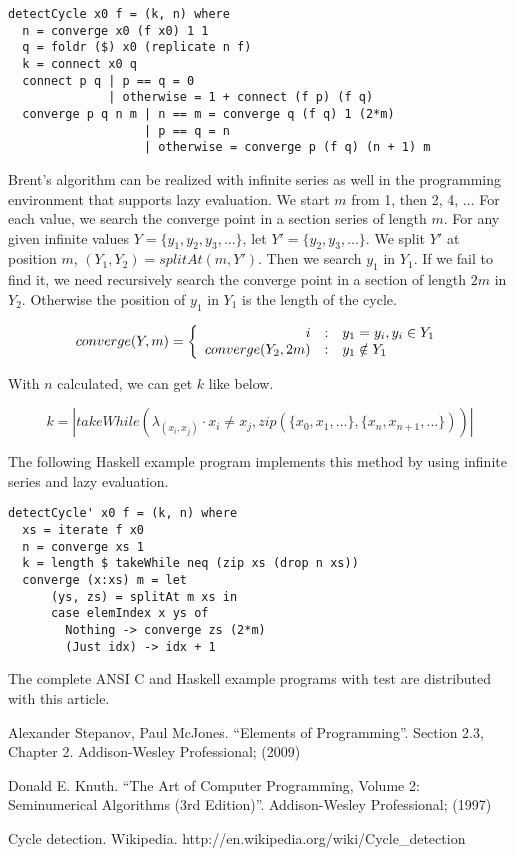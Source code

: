 \documentclass{article}
\begin{document}
\lstset{language=Haskell}
\begin{lstlisting}
detectCycle x0 f = (k, n) where
  n = converge x0 (f x0) 1 1
  q = foldr ($) x0 (replicate n f)
  k = connect x0 q
  connect p q | p == q = 0
              | otherwise = 1 + connect (f p) (f q)
  converge p q n m | n == m = converge q (f q) 1 (2*m)
                   | p == q = n
                   | otherwise = converge p (f q) (n + 1) m
\end{lstlisting}

Brent's algorithm can be realized with infinite series as well in the programming environment that supports
lazy evaluation. We start $m$ from 1, then 2, 4, ... For each value, we search the converge point in
a section series of length $m$. For any given infinite values $Y = \{y_1, y_2, y_3, ...\}$, let
$Y' = \{y_2, y_3, ...\}$. We split $Y'$ at position $m$,
$(Y_1, Y_2) = splitAt(m, Y')$. Then we search $y_1$ in $Y_1$. If we fail to find it, we need
recursively search the converge point in a section of length $2m$ in $Y_2$. Otherwise the
position of $y_1$ in $Y_1$ is the length of the cycle.

\begin{equation}
converge(Y, m) = \left \{
  \begin{array}
  {r@{\quad:\quad}l}
  i & y_1 = y_i, y_i \in Y_1 \\
  converge(Y_2, 2m) & y_1 \notin Y_1
  \end{array}
\right.
\end{equation}

With $n$ calculated, we can get $k$ like below.

\begin{equation}
k = |takeWhile(\lambda_{(x_i, x_j)} \cdot x_i \neq x_j, zip(\{x_0, x_1, ... \}, \{x_{n}, x_{n+1}, ...\}))|
\end{equation}

The following Haskell example program implements this method by using infinite series and lazy evaluation.

\lstset{language=Haskell}
\begin{lstlisting}
detectCycle' x0 f = (k, n) where
  xs = iterate f x0
  n = converge xs 1
  k = length $ takeWhile neq (zip xs (drop n xs))
  converge (x:xs) m = let
      (ys, zs) = splitAt m xs in
      case elemIndex x ys of
        Nothing -> converge zs (2*m)
        (Just idx) -> idx + 1
\end{lstlisting}

The complete ANSI C and Haskell example programs with test are distributed with this article.

\begin{thebibliography}{99}

Alexander Stepanov, Paul McJones. ``Elements of Programming''. Section 2.3, Chapter 2. Addison-Wesley Professional; (2009)

Donald E. Knuth. ``The Art of Computer Programming, Volume 2: Seminumerical Algorithms (3rd Edition)''. Addison-Wesley Professional; (1997)

Cycle detection. Wikipedia. http://en.wikipedia.org/wiki/Cycle\_detection

\end{thebibliography}
\end{document}
